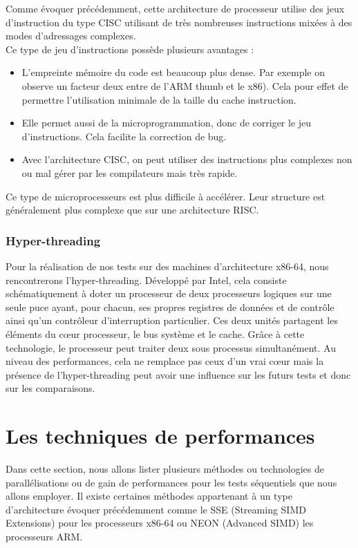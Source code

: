 Comme évoquer précédemment, cette architecture de processeur utilise des jeux d'instruction du type CISC utilisant de très nombreuses instructions mixées à des modes d'adressages complexes. \\
Ce type de jeu d'instructions possède plusieurs avantages :
\begin{itemize}
	\item L'empreinte mémoire du code est beaucoup plus dense. Par exemple on observe un facteur deux entre de l'ARM thumb et le x86). Cela pour effet de permettre l'utilisation minimale de la taille du cache instruction.
	\item Elle permet aussi de la microprogrammation, donc de corriger le jeu d'instructions. Cela facilite la correction de bug.
	\item Avec l'architecture CISC, on peut utiliser des instructions plus complexes non ou mal gérer par les compilateurs mais très rapide.
\end{itemize}
Ce type de microprocesseurs est plus difficile à accélérer. Leur structure est généralement plus complexe que sur une architecture RISC.

\subsubsection{ Hyper-threading }

Pour la réalisation de nos tests sur des machines d'architecture x86-64, 
nous rencontrerons l'hyper-threading. Développé par Intel, cela consiste schématiquement à doter un processeur de deux processeurs logiques sur une seule puce ayant, pour chacun, ses propres registres de données et de contrôle ainsi qu'un contrôleur d'interruption particulier. Ces deux unités partagent les éléments du cœur processeur, le bus système et le cache. Grâce à cette technologie, le processeur peut traiter deux sous processus simultanément. Au niveau des performances, cela ne remplace pas ceux d'un vrai cœur mais la présence de l'hyper-threading peut avoir une influence sur les futurs tests et donc sur les comparaisons. 

\section{ Les techniques de performances }

Dans cette section, nous allons lister plusieurs méthodes ou technologies de parallélisations ou de gain de performances pour les tests séquentiels que nous allons employer. Il existe certaines méthodes appartenant à un type d'architecture évoquer précédemment comme le SSE (Streaming SIMD Extensions) pour les processeurs x86-64 ou NEON (Advanced SIMD) les processeurs ARM.

